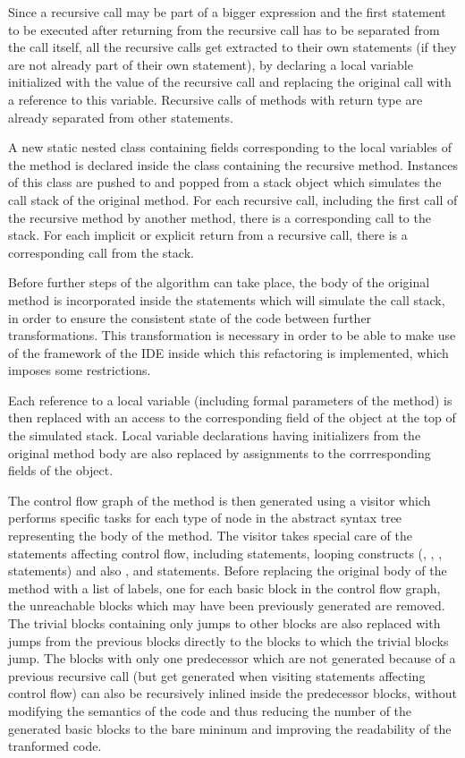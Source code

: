 Since a recursive call may be part of a bigger expression and the first statement to be executed after returning from
the recursive call has to be separated from the call itself, all the recursive calls get extracted to their own
statements (if they are not already part of their own statement), by declaring a local variable initialized with the
value of the recursive call and replacing the original call with a reference to this variable. Recursive calls of
methods with  return type are already separated from other statements.

A new static nested class containing fields corresponding to the local variables of the method is declared inside the
class containing the recursive method. Instances of this class are pushed to and popped from a stack object which
simulates the call stack of the original method. For each recursive call, including the first call of the recursive
method by another method, there is a corresponding  call to the stack. For each implicit or explicit return
from a recursive call, there is a corresponding  call from the stack.

Before further steps of the algorithm can take place, the body of the original method is incorporated inside the
statements which will simulate the call stack, in order to ensure the consistent state of the code between further
transformations. This transformation is necessary in order to be able to make use of the framework of the IDE inside
which this refactoring is implemented, which imposes some restrictions.

Each reference to a local variable (including formal parameters of the method) is then replaced with an access to the
corresponding field of the  object at the top of the simulated stack. Local variable declarations having
initializers from the original method body are also replaced by assignments to the corrresponding fields of the
 object.

The control flow graph of the method is then generated using a visitor which performs specific tasks for each type of
node in the abstract syntax tree representing the body of the method. The visitor takes special care of the statements
affecting control flow, including  statements, looping constructs (, , ,
 statements) and also ,  and  statements. Before replacing the
original body of the method with a list of  labels, one for each basic block in the control flow graph,
the unreachable blocks which may have been previously generated are removed. The trivial blocks containing only jumps to
other blocks are also replaced with jumps from the previous blocks directly to the blocks to which the trivial blocks
jump. The blocks with only one predecessor which are not generated because of a previous recursive call (but get
generated when visiting statements affecting control flow) can also be recursively inlined inside the predecessor
blocks, without modifying the semantics of the code and thus reducing the number of the generated basic blocks to the
bare mininum and improving the readability of the tranformed code.

